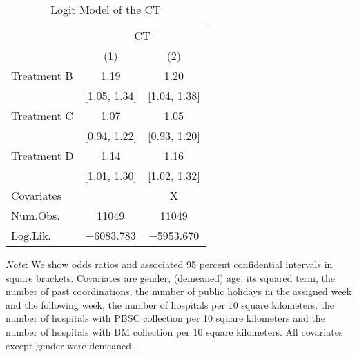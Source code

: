 \documentclass[12pt, a4paper]{article}
\begin{document}
\begin{table}[H]

\caption{\label{tab:logit-test}Logit Model of the CT}
\centering
\fontsize{8}{10}\selectfont
\begin{threeparttable}
\begin{tabular}[t]{lcc}
\toprule
\multicolumn{1}{c}{ } & \multicolumn{2}{c}{CT} \\
\cmidrule(l{3pt}r{3pt}){2-3}
  & (1) & (2)\\
\midrule
Treatment B & \num{1.19} & \num{1.20}\\
 & {}[\num{1.05}, \num{1.34}] & {}[\num{1.04}, \num{1.38}]\\
Treatment C & \num{1.07} & \num{1.05}\\
 & {}[\num{0.94}, \num{1.22}] & {}[\num{0.93}, \num{1.20}]\\
Treatment D & \num{1.14} & \num{1.16}\\
 & {}[\num{1.01}, \num{1.30}] & {}[\num{1.02}, \num{1.32}]\\
\midrule
Covariates &  & X\\
Num.Obs. & \num{11049} & \num{11049}\\
Log.Lik. & \num{-6083.783} & \num{-5953.670}\\
\bottomrule
\end{tabular}
\begin{tablenotes}
\item \emph{Note}: We show odds ratios and associated 95 percent confidential intervals in square brackets. Covariates are gender, (demeaned) age, its squared term, the number of past coordinations, the number of public holidays in the assigned week and the following week, the number of hospitals per 10 square kilometers, the number of hospitals with PBSC collection per 10 square kilometers and the number of hospitals with BM collection per 10 square kilometers. All covariates except gender were demeaned.
\end{tablenotes}
\end{threeparttable}
\end{table}
\end{document}
